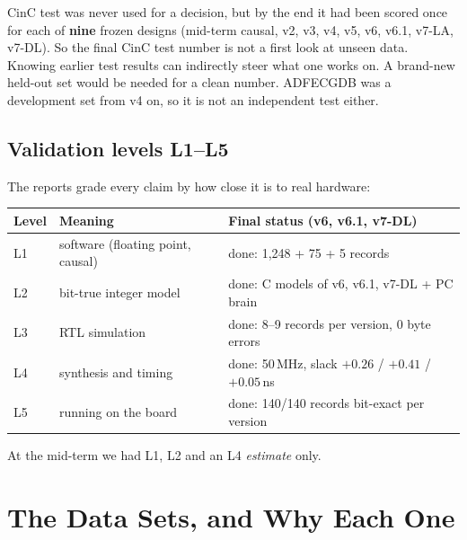\documentclass[11pt]{article}
\begin{document}
\begin{warn}
CinC test was never used for a decision, but by the end it had been scored once for each of \textbf{nine} frozen designs (mid-term causal, v2, v3, v4, v5, v6, v6.1, v7-LA, v7-DL). So the final CinC test number is not a first look at unseen data. Knowing earlier test results can indirectly steer what one works on. A brand-new held-out set would be needed for a clean number. ADFECGDB was a development set from v4 on, so it is not an independent test either.
\end{warn}

\subsection{Validation levels L1--L5}
The reports grade every claim by how close it is to real hardware:
\begin{center}
\small
\begin{tabular}{@{}lll@{}}
\toprule
\textbf{Level} & \textbf{Meaning} & \textbf{Final status (v6, v6.1, v7-DL)} \\
\midrule
L1 & software (floating point, causal) & done: 1,248 + 75 + 5 records \\
L2 & bit-true integer model & done: C models of v6, v6.1, v7-DL + PC brain \\
L3 & RTL simulation & done: 8--9 records per version, 0 byte errors \\
L4 & synthesis and timing & done: 50\,MHz, slack $+0.26$ / $+0.41$ / $+0.05$\,ns \\
L5 & running on the board & done: 140/140 records bit-exact per version \\
\bottomrule
\end{tabular}
\end{center}
At the mid-term we had L1, L2 and an L4 \emph{estimate} only.

\section{The Data Sets, and Why Each One}
\label{sec:data}
\end{document}
